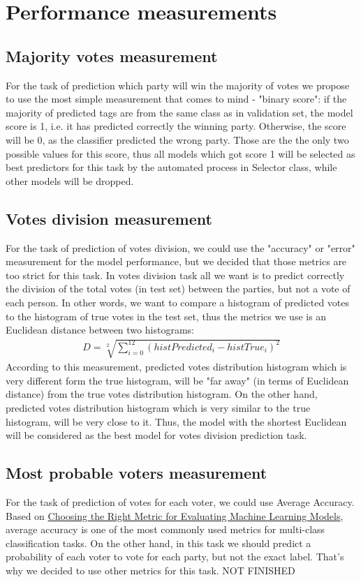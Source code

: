 \documentclass[12pt]{article}
\begin{document}
\newpage
\section{Performance measurements}
\subsection{Majority votes measurement}
For the task of prediction which party will win the majority of votes we propose to use the most simple measurement that comes to mind - "binary score": if the majority of predicted tags are from the same class as in validation set, the model score is 1, i.e. it has predicted correctly the winning party. Otherwise, the score will be 0, as the classifier predicted the wrong party. Those are the the only two possible values for this score, thus all models which got score 1 will be selected as best predictors for this task by the automated process in Selector class, while other models will be dropped.

\subsection{Votes division measurement}
For the task of prediction of votes division, we could use the "accuracy" or "error" measurement for the model performance, but we decided that those metrics are too strict for this task. In votes division task all we want is to predict correctly the division of the total votes (in test set) between the parties, but not a vote of each person. In other words, we want to compare a histogram of predicted votes to the histogram of true votes in the test set, thus the metrics we use is an Euclidean distance between two histograms:
\begin{gather*}
D = \sqrt[2]{\sum_{i=0}^{12} (histPredicted_i - histTrue_i)^2}   
\end{gather*}
According to this measurement, predicted votes distribution histogram which is very different form the true histogram, will be "far away" (in terms of Euclidean distance) from the true votes distribution histogram. On the other hand, predicted votes distribution histogram which is very similar to the true histogram, will be very close to it. Thus, the model with the shortest Euclidean will be considered as the best model for votes division prediction task.  

\subsection{Most probable voters measurement}
For the task of prediction of votes for each voter, we could use Average Accuracy. Based on 
\href{https://medium.com/usf-msds/choosing-the-right-metric-for-evaluating-machine-learning-models-part-2-86d5649a5428}{Choosing the Right Metric for Evaluating Machine Learning Models}, average accuracy is one of the most commonly used metrics for multi-class classification tasks. On the other hand, in this task we should predict a probability of each voter to vote for each party, but not the exact label. That's why we decided to use other metrics for this task. NOT FINISHED 
 
\end{document}

